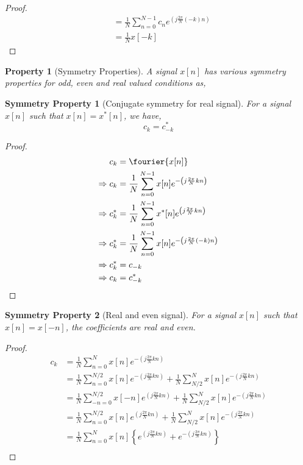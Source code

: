\documentclass{home_assignment}
\newtheorem{theorem}{Property}
\newtheorem{subtheorem}{Symmetry Property}[theorem]
\begin{document}
{\begin{proof}
$$\begin{aligned}
&=\frac{1}{N}\sum_{n=0}^{N-1} c_n e^{\left(j \frac{2 \pi}{N} (-k) n\right)}\\
&=\frac{1}{N}x[-k]
\end{aligned}
$$
\enlargethispage{\baselineskip}
\end{proof}
\begin{theorem}[Symmetry Properties]
A signal $x[n]$ has various symmetry properties for odd, even and real valued conditions as,
\end{theorem}
\begin{subtheorem}[Conjugate symmetry for real signal]
For a signal $x[n]$ such that $x[n]=x^*[n]$, we have,
$$c_k=c^*_{-k}$$
\end{subtheorem}
\begin{proof}
$$
\begin{aligned}
c_k&=\fourier{x[n]}\\
\Rightarrow c_k&=\frac{1}{N} \sum_{n=0}^{N-1} x[n] e^{-\left(j \frac{2 \pi}{N} k n\right)}\\
\Rightarrow c^*_k&=\frac{1}{N} \sum_{n=0}^{N-1} x^*[n] e^{\left(j \frac{2 \pi}{N} k n\right)}\\
\Rightarrow c^*_{k}&=\frac{1}{N} \sum_{n=0}^{N-1} x[n] e^{-\left(j \frac{2 \pi}{N} (-k) n\right)}\\
\Rightarrow  c^*_{k}&=c_{-k}\\
\Rightarrow  c_{k}&=c^*_{-k}
\end{aligned}
$$
\end{proof}
\begin{subtheorem}[Real and even signal]
For a signal $x[n]$ such that $x[n]=x[-n]$, the coefficients are real and even.
\end{subtheorem}
\begin{proof}
$$
\begin{aligned}
c_k&=\frac{1}{N} \sum_{n=0}^{N} x[n] e^{-\left(j \frac{2 \pi}{N} k n\right)}\\
&=\frac{1}{N} \sum_{n=0}^{N/2} x[n] e^{-\left(j \frac{2 \pi}{N} k n\right)}+\frac{1}{N} \sum_{N/2}^{N} x[n] e^{-\left(j \frac{2 \pi}{N} k n\right)}\\
&=\frac{1}{N} \sum_{-n=0}^{N/2} x[-n] e^{\left(j \frac{2 \pi}{N} k n\right)}+\frac{1}{N} \sum_{N/2}^{N} x[n] e^{-\left(j \frac{2 \pi}{N} k n\right)}\\
&=\frac{1}{N} \sum_{n=0}^{N/2} x[n] e^{\left(j \frac{2 \pi}{N} k n\right)}+\frac{1}{N} \sum_{N/2}^{N} x[n] e^{-\left(j \frac{2 \pi}{N} k n\right)}\\
&=\frac{1}{N} \sum_{n=0}^{N} x[n]\left\lbrace e^{\left(j \frac{2 \pi}{N} k n\right)}+e^{-\left(j \frac{2 \pi}{N} k n\right)}\right\rbrace\\

\end{aligned}$$
\end{proof}}
\end{document}
